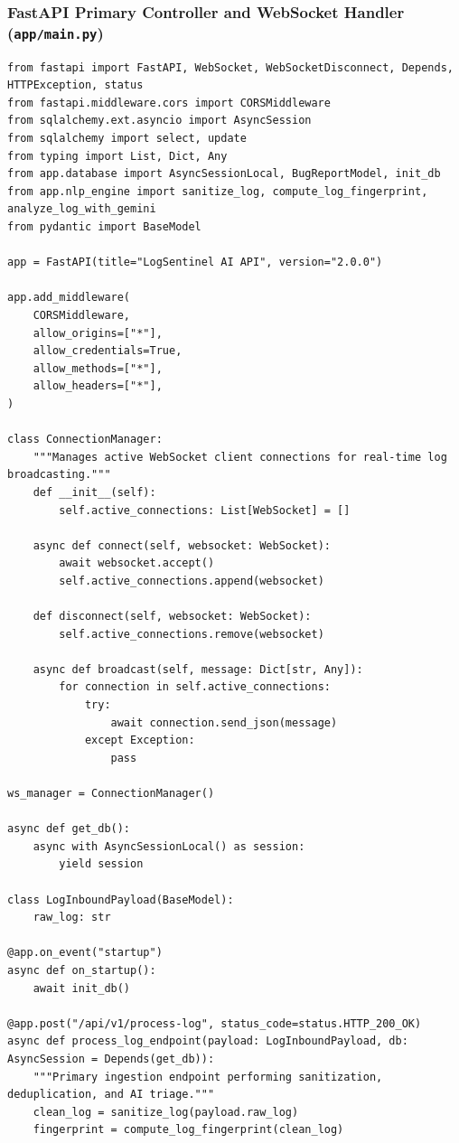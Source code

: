 \documentclass[12pt,a4paper]{article}
\begin{document}
\clearpage
\subsubsection{FastAPI Primary Controller and WebSocket Handler (\texttt{app/main.py})}
\begin{lstlisting}[style=pystyle, caption={FastAPI Application Controller with Real-Time WebSocket Streaming}]
from fastapi import FastAPI, WebSocket, WebSocketDisconnect, Depends, HTTPException, status
from fastapi.middleware.cors import CORSMiddleware
from sqlalchemy.ext.asyncio import AsyncSession
from sqlalchemy import select, update
from typing import List, Dict, Any
from app.database import AsyncSessionLocal, BugReportModel, init_db
from app.nlp_engine import sanitize_log, compute_log_fingerprint, analyze_log_with_gemini
from pydantic import BaseModel

app = FastAPI(title="LogSentinel AI API", version="2.0.0")

app.add_middleware(
    CORSMiddleware,
    allow_origins=["*"],
    allow_credentials=True,
    allow_methods=["*"],
    allow_headers=["*"],
)

class ConnectionManager:
    """Manages active WebSocket client connections for real-time log broadcasting."""
    def __init__(self):
        self.active_connections: List[WebSocket] = []

    async def connect(self, websocket: WebSocket):
        await websocket.accept()
        self.active_connections.append(websocket)

    def disconnect(self, websocket: WebSocket):
        self.active_connections.remove(websocket)

    async def broadcast(self, message: Dict[str, Any]):
        for connection in self.active_connections:
            try:
                await connection.send_json(message)
            except Exception:
                pass

ws_manager = ConnectionManager()

async def get_db():
    async with AsyncSessionLocal() as session:
        yield session

class LogInboundPayload(BaseModel):
    raw_log: str

@app.on_event("startup")
async def on_startup():
    await init_db()

@app.post("/api/v1/process-log", status_code=status.HTTP_200_OK)
async def process_log_endpoint(payload: LogInboundPayload, db: AsyncSession = Depends(get_db)):
    """Primary ingestion endpoint performing sanitization, deduplication, and AI triage."""
    clean_log = sanitize_log(payload.raw_log)
    fingerprint = compute_log_fingerprint(clean_log)


\end{lstlisting}
\end{document}

